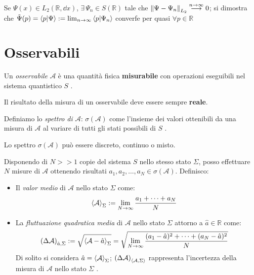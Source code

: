 Se \(\Psi(x) \in L_2(\mathbb{R}, \dd{x})\), \(\exists \, \Psi_n \in S(\mathbb{R})\) tale che \(\norm{\Psi-\Psi_n}_{L_2}\overset{n \to \infty}{\longrightarrow} 0\); 
si dimostra che \(\tilde{\Psi}(p)= \braket{p}{\Psi} : = \lim_{n\to \infty}\braket{p}{\Psi_n}\) converfe per quasi \(\forall p \in \mathbb{R}\)


\section{Osservabili}
\begin{definition}
    Un \textit{osservabile} \(\mathcal{A}\) è una quantità fisica \textbf{misurabile } con operazioni eseguibili nel sistema quantistico \(S\) .
\end{definition}
Il risultato della misura di un osservabile deve essere sempre \textbf{reale}.

\begin{definition}
    Definiamo lo \textit{spettro di } \(\mathcal{A}\): \(\sigma(\mathcal{A})\) come l'insieme dei valori ottenibili da una
    misura di \(\mathcal{A}\) al variare di tutti gli stati possibili di \(S\) .
\end{definition}

Lo spettro \(\sigma(\mathcal{A})\) può essere discreto, continuo o misto.

\begin{definition}
    Disponendo di \(N >> 1 \) copie del sistema \(S\) nello stesso stato \(\Sigma\), posso effettuare \(N\) misure di \(\mathcal{A}\) 
    ottenendo risultati \(a_1,a_2,\dots, a_N \in \sigma(\mathcal{A})\). Definisco:
    \begin{itemize}
        \item Il \textit{valor medio } di \(\mathcal{A}\) nello stato \(\Sigma\) come: \[
            \expval{\mathcal{A}}_\Sigma := \lim_{N\to \infty} \frac{a_1+\dots+a_N}{N}
        \]
        \item La \textit{fluttuazione quadratica media} di \(\mathcal{A}\) nello stato \(\Sigma\) attorno a \(\hat{a} \in \mathbb{R}\) come: \[
            \left( \Delta \mathcal{A} \right)_{\hat{a}, \Sigma}:= \sqrt{\expval{\mathcal{A}- \hat{a}}_\Sigma}= \sqrt{\lim_{N \to \infty} \frac{(a_1-\hat{a})^2+ \dots+ (a_N-\hat{a})^2}{N}} 
        \] Di solito si considera \(\hat{a}= \expval{\mathcal{A}}_\Sigma\); \(\left( \Delta\mathcal{A} \right)_{\expval{\mathcal{A}, \Sigma}}\) rappresenta l'incertezza della misura di \(\mathcal{A}\) nello stato \(\Sigma\) .
    \end{itemize}
\end{definition}

